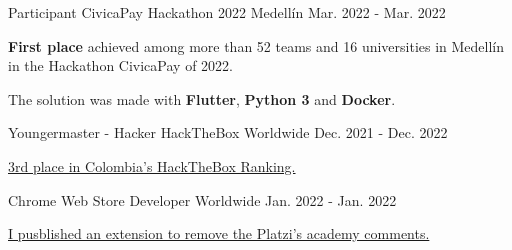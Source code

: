 
\begin{cventries}

  \cventry
  {Participant} %
  {CivicaPay Hackathon 2022} %
  {Medellín} %
  {Mar. 2022 - Mar. 2022} %
  {
    \begin{cvitems} %
      \item {\textbf{First place} achieved among more than 52 teams and 16 universities in
                  Medellín in the Hackathon CivicaPay of 2022.}
      \item {The solution was made with \textbf{Flutter}, \textbf{Python 3} and \textbf{Docker}.}
    \end{cvitems}
  }

  \cventry
  {Youngermaster - Hacker} %
  {HackTheBox} %
  {Worldwide} %
  {Dec. 2021 - Dec. 2022} %
  {
    \begin{cvitems} %
      \item {\href{https://app.hackthebox.com/profile/643960}{3rd place in Colombia's HackTheBox Ranking.}}
    \end{cvitems}
  }

  \cventry
  {Chrome Web Store} %
  {Developer} %
  {Worldwide} %
  {Jan. 2022 - Jan. 2022} %
  {
    \begin{cvitems} %
      \item {\href{https://chrome.google.com/webstore/detail/platzi-community-wrapper/dakgbbfpefoofghfbkopnbnpadeblbep}
                  {I pusblished an extension to remove the Platzi's academy comments.}}
    \end{cvitems}
  }


\end{cventries}
